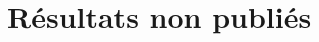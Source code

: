 \documentclass[\main/main.tex]{subfiles}
\begin{document}
\chapter{Résultats non publiés}






\end{document}
